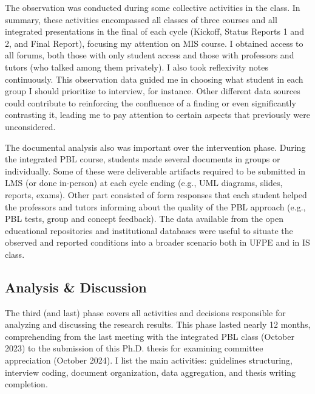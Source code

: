 The observation was conducted during some collective activities in the class. In summary, these activities encompassed all classes of three courses and all integrated presentations in the final of each cycle (Kickoff, Status Reports 1 and 2, and Final Report), focusing my attention on \gls{MIS} course. I obtained access to all forums, both those with only student access and those with professors and tutors (who talked among them privately). I also took reflexivity notes continuously. This observation data guided me in choosing what student in each group I should prioritize to interview, for instance. Other different data sources could contribute to reinforcing the confluence of a finding or even significantly contrasting it, leading me to pay attention to certain aspects that previously were unconsidered. 

The documental analysis also was important over the intervention phase. During the integrated \gls{PBL} course, students made several documents in groups or individually. Some of these were deliverable artifacts required to be submitted in \gls{LMS} (or done in-person) at each cycle ending (e.g., \gls{UML} diagrams, slides, reports, exams). Other part consisted of form responses that each student helped the professors and tutors informing about the quality of the \gls{PBL} approach (e.g., \gls{PBL} tests, group and concept feedback). The data available from the open educational repositories and institutional databases were useful to situate the observed and reported conditions into a broader scenario both in \gls{UFPE} and in \gls{IS} class.%



\subsection{Analysis \& Discussion}
\label{phd-route-ss:ana-dis}

The third (and last) phase covers all activities and decisions responsible for analyzing and discussing the research results. This phase lasted nearly 12 months, comprehending from the last meeting with the integrated \gls{PBL} class (October 2023) to the submission of this \gls{Ph.D.} thesis for examining committee appreciation (October 2024). I list the main activities: guidelines structuring, interview coding, document organization, data aggregation, and thesis writing completion.

